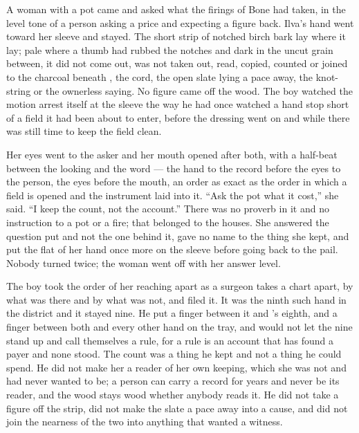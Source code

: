 A woman with a pot came and asked what the firings of Bone had taken, in the level tone of a person asking a price and expecting a figure back. Ilva's hand went toward her sleeve and stayed. The short strip of notched birch bark lay where it lay; pale where a thumb had rubbed the notches and dark in the uncut grain between, it did not come out, was not taken out, read, copied, counted or joined to the charcoal beneath , the cord, the open slate lying a pace away, the knot-string or the ownerless saying. No figure came off the wood. The boy watched the motion arrest itself at the sleeve the way he had once watched a hand stop short of a field it had been about to enter, before the dressing went on and while there was still time to keep the field clean.

Her eyes went to the asker and her mouth opened after both, with a half-beat between the looking and the word --- the hand to the record before the eyes to the person, the eyes before the mouth, an order as exact as the order in which a field is opened and the instrument laid into it. “Ask the pot what it cost,” she said. “I keep the count, not the account.” There was no proverb in it and no instruction to a pot or a fire; that belonged to the houses. She answered the question put and not the one behind it, gave no name to the thing she kept, and put the flat of her hand once more on the sleeve before going back to the pail. Nobody turned twice; the woman went off with her answer level.

\scenebreak

The boy took the order of her reaching apart as a surgeon takes a chart apart, by what was there and by what was not, and filed it. It was the ninth such hand in the district and it stayed nine. He put a finger between it and 's eighth, and a finger between both and every other hand on the tray, and would not let the nine stand up and call themselves a rule, for a rule is an account that has found a payer and none stood. The count was a thing he kept and not a thing he could spend. He did not make her a reader of her own keeping, which she was not and had never wanted to be; a person can carry a record for years and never be its reader, and the wood stays wood whether anybody reads it. He did not take a figure off the strip, did not make the slate a pace away into a cause, and did not join the nearness of the two into anything that wanted a witness.

